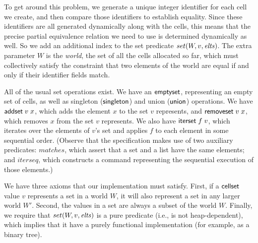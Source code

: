 To get around this problem, we generate a unique integer identifier
for each cell we create, and then compare those identifiers to
establish equality. Since these identifiers are all generated
dynamically along with the cells, this means that the precise partial
equivalence relation we need to use is determined dynamically as
well. So we add an additional index to the set predicate $set(W, v,
\mathit{elts})$. The extra parameter $W$ is the \emph{world}, the set of all
the cells allocated so far, which must collectively satisfy the
constraint that two elements of the world are equal if and only if their
identifier fields match.

All of the usual set operations exist. We have an $\mathsf{emptyset}$,
representing an empty set of cells, as well as singleton
($\mathsf{singleton}$) and union ($\mathsf{union}$) operations.  We have
$\mathsf{addset}\;v\;x$, which adds the element $x$ to the set $v$
represents, and $\mathsf{removeset}\;v\;x$, which removes $x$ from the
set $v$ represents. We also have $\mathsf{iterset}\;f\;v$, which
iterates over the elements of $v$'s set and applies $f$ to each
element in some sequential order. (Observe that the specification
makes use of two auxiliary predicates: $matches$, which assert that a
set and a list have the same elements; and $iterseq$, which constructs
a command representing the sequential execution of those elements.)

We have three axioms that our implementation must satisfy. First, if a
$\mathsf{cellset}$ value $v$ represents a set in a world $W$, it will also
represent a set in any larger world $W'$. Second, the values in a set
are always a subset of the world $W$. Finally, we require that
$set(W,v,\mathit{elts})$ is a pure predicate (i.e., is not heap-dependent),
which implies that it have a purely functional implementation (for
example, as a binary tree). 

